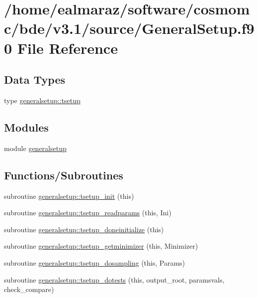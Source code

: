 \hypertarget{GeneralSetup_8f90}{}\section{/home/ealmaraz/software/cosmomc/bde/v3.1/source/\+General\+Setup.f90 File Reference}
\label{GeneralSetup_8f90}
\subsection*{Data Types}
\begin{DoxyCompactItemize}
\item 
type \mbox{\hyperlink{structgeneralsetup_1_1tsetup}{generalsetup\+::tsetup}}
\end{DoxyCompactItemize}
\subsection*{Modules}
\begin{DoxyCompactItemize}
\item 
module \mbox{\hyperlink{namespacegeneralsetup}{generalsetup}}
\end{DoxyCompactItemize}
\subsection*{Functions/\+Subroutines}
\begin{DoxyCompactItemize}
\item 
subroutine \mbox{\hyperlink{namespacegeneralsetup_af2242426644f3fa7db9c7ca3726aeaca}{generalsetup\+::tsetup\+\_\+init}} (this)
\item 
subroutine \mbox{\hyperlink{namespacegeneralsetup_a2153d54792461f99885b6bdc078cbfe8}{generalsetup\+::tsetup\+\_\+readparams}} (this, Ini)
\item 
subroutine \mbox{\hyperlink{namespacegeneralsetup_acfe3cccd27f6794ef55ded35c5a7e63b}{generalsetup\+::tsetup\+\_\+doneinitialize}} (this)
\item 
subroutine \mbox{\hyperlink{namespacegeneralsetup_ab96236dacfcf61193bfa8604d0f82fc0}{generalsetup\+::tsetup\+\_\+getminimizer}} (this, Minimizer)
\item 
subroutine \mbox{\hyperlink{namespacegeneralsetup_aa31d5951f5285c856d2291afcb518b01}{generalsetup\+::tsetup\+\_\+dosampling}} (this, Params)
\item 
subroutine \mbox{\hyperlink{namespacegeneralsetup_a8fafc07faa08ebbfd2ba87e7737ac72f}{generalsetup\+::tsetup\+\_\+dotests}} (this, output\+\_\+root, paramsvals, check\+\_\+compare)
\end{DoxyCompactItemize}
